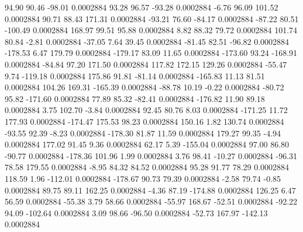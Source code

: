        94.90       90.46      -98.01     0.0002884
       93.28       96.57      -93.28     0.0002884
       -6.76       96.09      101.52     0.0002884
       90.71       88.43      171.31     0.0002884
      -93.21       76.60      -84.17     0.0002884
      -87.22       80.51     -100.49     0.0002884
      168.97       99.51       95.88     0.0002884
        8.82       88.32       79.72     0.0002884
      101.74       80.84       -2.81     0.0002884
      -37.05        7.64       39.45     0.0002884
      -81.45       82.51      -96.82     0.0002884
     -178.53        6.47      179.79     0.0002884
     -179.17       83.09       11.65     0.0002884
     -173.60       93.24     -168.91     0.0002884
      -84.84       97.20      171.50     0.0002884
      117.82      172.15      129.26     0.0002884
      -55.47        9.74     -119.18     0.0002884
      175.86       91.81      -81.14     0.0002884
     -165.83       11.13       81.51     0.0002884
      104.26      169.31     -165.39     0.0002884
      -88.78       10.19       -0.22     0.0002884
      -80.72       95.82     -171.60     0.0002884
       77.89       85.32      -82.41     0.0002884
     -176.82       11.90       89.18     0.0002884
        3.75      102.70       -3.84     0.0002884
       92.45       80.76        8.03     0.0002884
     -171.25       11.72      177.93     0.0002884
     -174.47      175.53       98.23     0.0002884
      150.16        1.82      130.74     0.0002884
      -93.55       92.39       -8.23     0.0002884
     -178.30       81.87       11.59     0.0002884
      179.27       99.35       -4.94     0.0002884
      177.02       91.45        9.36     0.0002884
       62.17        5.39     -155.04     0.0002884
       97.00       86.80      -90.77     0.0002884
     -178.36      101.96        1.99     0.0002884
        3.76       98.41      -10.27     0.0002884
      -96.31       78.58      179.55     0.0002884
       -8.95       84.32       84.52     0.0002884
       95.28       91.77       78.29     0.0002884
      118.59        1.96     -112.01     0.0002884
     -178.67       90.73       79.39     0.0002884
       -2.58       79.74       -0.85     0.0002884
       89.75       89.11      162.25     0.0002884
       -4.36       87.19     -174.88     0.0002884
      126.25        6.47       56.59     0.0002884
      -55.38        3.79       58.66     0.0002884
      -55.97      168.67      -52.51     0.0002884
      -92.22       94.09     -102.64     0.0002884
        3.09       98.66      -96.50     0.0002884
      -52.73      167.97     -142.13     0.0002884
